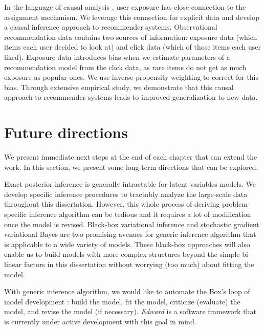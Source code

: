 In the language of causal analysis \citep{imbens2015causal}, user exposure has close connection to the assignment mechanism. We leverage this connection for explicit data and develop a causal inference approach to recommender systems. 
Observational recommendation data contains two sources of
information: exposure data (which items each user decided to look at) and click data (which of
those items each user liked). Exposure data introduces bias when we estimate parameters of a recommendation model from the click data, as rare items do not get as much exposure as popular ones. We use inverse propensity weighting to correct for this bias. Through extensive empirical study, we demonstrate that this causal approach to recommender systems leads to improved generalization to new data.

\section{Future directions}

We present immediate next steps at the end of each chapter that can extend the work. In this section, we present some long-term directions that can be explored.

Exact posterior inference is generally intractable for latent variables models. We develop specific inference procedures to tractably analyze the large-scale data throughout this dissertation. However, this whole process of deriving problem-specific inference algorithm can be tedious and it requires a lot of modification once the model is revised. Black-box variational inference \citep{DBLP:conf/aistats/RanganathGB14,kucukelbir2015automatic} and stochastic gradient variational Bayes \citep{kingma2013auto,rezende2014stochastic} are two promising avenues for generic inference algorithm that is applicable to a wide variety of models. These black-box approaches will also enable us to build models with more complex structures beyond the simple bi-linear factors in this dissertation without worrying (too much) about fitting the model.   

With generic inference algorithm, we would like to automate the Box's loop of model development \citep{box1976science,blei2014build}: build the model, fit the model, criticize (evaluate) the model, and revise the model (if necessary). 
\textit{Edward} \citep{tran2016edward} is a software framework that is currently under active development with this goal in mind. 

